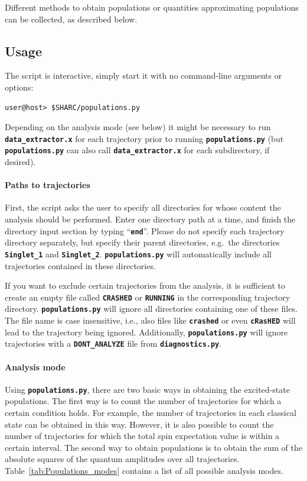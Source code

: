 \documentclass[a4paper,10pt,DIV=15,openany]{scrbook}
\newcommand{\ttt}[1]{\textbf{\texttt{#1}}}
\begin{document}
Different methods to obtain populations or quantities approximating populations can be collected, as described below.

\subsection{Usage}

The script is interactive, simply start it with no command-line arguments or options:
\begin{verbatim}
user@host> $SHARC/populations.py
\end{verbatim}

Depending on the analysis mode (see below) it might be necessary to run \ttt{data\_extractor.x} for each trajectory prior to running \ttt{populations.py} (but \ttt{populations.py} can also call \ttt{data\_extractor.x} for each subdirectory, if desired). 

\paragraph{Paths to trajectories}

First, the script asks the user to specify all directories for whose content the analysis should be performed. Enter one directory path at a time, and finish the directory input section by typing ``\ttt{end}''. Please do not specify each trajectory directory separately, but specify their parent directories, e.g.\ the directories \ttt{Singlet\_1} and \ttt{Singlet\_2}. \ttt{populations.py} will automatically include all trajectories contained in these directories.

If you want to exclude certain trajectories from the analysis, it is sufficient to create an empty file called \ttt{CRASHED} or \ttt{RUNNING} in the corresponding trajectory directory. \ttt{populations.py} will ignore all directories containing one of these files. The file name is case insensitive, i.e., also files like \ttt{crashed} or even \ttt{cRasHED} will lead to the trajectory being ignored.
Additionally, \ttt{populations.py} will ignore trajectories with a \ttt{DONT\_ANALYZE} file from \ttt{diagnostics.py}.

\paragraph{Analysis mode}

Using \ttt{populations.py}, there are two basic ways in obtaining the excited-state populations. The first way is to count the number of trajectories for which a certain condition holds. For example, the number of trajectories in each classical state can be obtained in this way. However, it is also possible to count the number of trajectories for which the total spin expectation value is within a certain interval. 
The second way to obtain populations is to obtain the sum of the absolute squares of the quantum amplitudes over all trajectories. Table~\ref{tab:Populations_modes} contains a list of all possible analysis modes.
\end{document}
